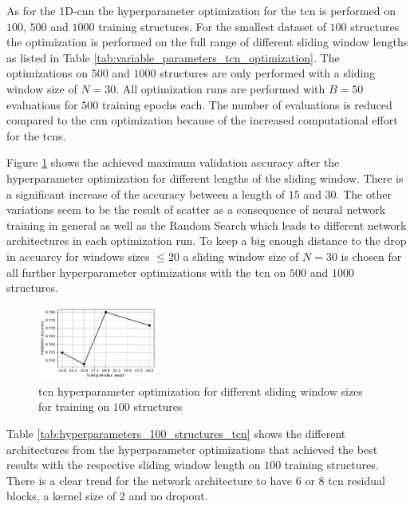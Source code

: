 \documentclass[conference]{IEEEtran}
\begin{document}
As for the 1D-\gls{cnn} the hyperparameter optimization for the \gls{tcn} is performed on $ 100 $, $ 500 $ and $ 1000 $  training structures. For the smallest dataset of $ 100 $ structures the optimization is performed on the full range of different sliding window lengths as listed in Table \ref{tab:variable_parameters_tcn_optimization}. The optimizations on $ 500 $ and $ 1000 $ structures are only performed with a sliding window size of $ N = 30 $. All optimization runs are performed with $ B = 50 $ evaluations for $ 500 $ training epochs each. The number of evaluations is reduced compared to the \gls{cnn} optimization because of the increased computational effort for the \glspl{tcn}.

Figure \ref{fig:influence_sequence_length_tcn} shows the achieved maximum validation accuracy after the hyperparameter optimization for different lengths of the sliding window. There is a significant increase of the accuracy between a length of $ 15 $ and $ 30 $. The other variations seem to be the result of scatter as a consequence of neural network training in general as well as the Random Search which leads to different network architectures in each optimization run. To keep a big enough distance to the drop in accuarcy for windows sizes $ \leq 20 $ a sliding window size of $ N = 30 $ is chosen for all further hyperparameter optimizations with the \gls{tcn} on $ 500 $ and $ 1000 $ structures.

\begin{figure}[htp]
	\centering
	\includegraphics[width=0.35\textwidth]{python/influence_sequence_length_tcn.pdf}
	\caption{\gls{tcn} hyperparameter optimization for different sliding window sizes for training on $ 100 $ structures}
	\label{fig:influence_sequence_length_tcn}
\end{figure}

Table \ref{tab:hyperparameters_100_structures_tcn} shows the different architectures from the hyperparameter optimizations that achieved the best results with the respective sliding window length on $ 100 $ training structures. There is a clear trend for the network architecture to have $ 6 $ or $ 8 $ \gls{tcn} residual blocks, a kernel size of $ 2 $ and no dropout.
\end{document}
